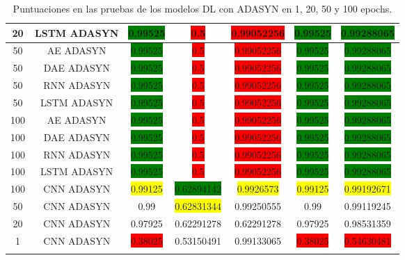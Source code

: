 \begin{longtable}{|c|c|c|c|c|c|c|}
	20 & LSTM ADASYN & \colorbox{green}{0.99525} & \colorbox{red}{0.5} & \colorbox{red}{0.99052256} & \colorbox{green}{0.99525} & \colorbox{green}{0.99288065}\\ \hline
	50 & AE ADASYN & \colorbox{green}{0.99525} & \colorbox{red}{0.5} & \colorbox{red}{0.99052256} & \colorbox{green}{0.99525} & \colorbox{green}{0.99288065}\\ \hline
	50 & DAE ADASYN & \colorbox{green}{0.99525} & \colorbox{red}{0.5} & \colorbox{red}{0.99052256} & \colorbox{green}{0.99525} & \colorbox{green}{0.99288065}\\ \hline
	50 & RNN ADASYN & \colorbox{green}{0.99525} & \colorbox{red}{0.5} & \colorbox{red}{0.99052256} & \colorbox{green}{0.99525} & \colorbox{green}{0.99288065}\\ \hline
	50 & LSTM ADASYN & \colorbox{green}{0.99525} & \colorbox{red}{0.5} & \colorbox{red}{0.99052256} & \colorbox{green}{0.99525} & \colorbox{green}{0.99288065}\\ \hline
	100 & AE ADASYN & \colorbox{green}{0.99525} & \colorbox{red}{0.5} & \colorbox{red}{0.99052256} & \colorbox{green}{0.99525} & \colorbox{green}{0.99288065}\\ \hline
	100 & DAE ADASYN & \colorbox{green}{0.99525} & \colorbox{red}{0.5} & \colorbox{red}{0.99052256} & \colorbox{green}{0.99525} & \colorbox{green}{0.99288065}\\ \hline
	100 & RNN ADASYN & \colorbox{green}{0.99525} & \colorbox{red}{0.5} & \colorbox{red}{0.99052256} & \colorbox{green}{0.99525} & \colorbox{green}{0.99288065}\\ \hline
	100 & LSTM ADASYN & \colorbox{green}{0.99525} & \colorbox{red}{0.5} & \colorbox{red}{0.99052256} & \colorbox{green}{0.99525} & \colorbox{green}{0.99288065}\\ \hline
	100 & CNN ADASYN & \colorbox{yellow}{0.99125} & \colorbox{green}{0.62894142} & \colorbox{yellow}{0.9926573} & \colorbox{yellow}{0.99125} & \colorbox{yellow}{0.99192671}\\ \hline
	50 & CNN ADASYN & 0.99 & \colorbox{yellow}{0.62831344} & 0.99250555 & 0.99 & 0.99119245\\ \hline
	20 & CNN ADASYN & 0.97925 & 0.62291278 & 0.62291278 & 0.97925 & 0.98531359\\ \hline
	1 & CNN ADASYN & \colorbox{red}{0.38025} & 0.53150491 & 0.99133065 & \colorbox{red}{0.38025} & \colorbox{red}{0.54630481}\\ \hline
	\caption{Puntuaciones en las pruebas de los modelos DL con ADASYN en 1, 20, 50 y 100 epochs.}
	\label{t:8}
\end{longtable}

